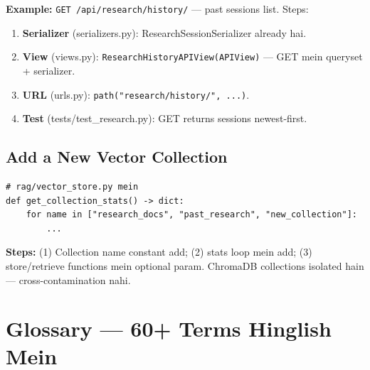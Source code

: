 \begin{codestorybox}
\textbf{Example:} \texttt{GET /api/research/history/} --- past sessions list. Steps:
\begin{enumerate}[label=\arabic*.]
\item \textbf{Serializer} (serializers.py): ResearchSessionSerializer already hai.
\item \textbf{View} (views.py): \texttt{ResearchHistoryAPIView(APIView)} --- GET mein queryset + serializer.
\item \textbf{URL} (urls.py): \texttt{path("research/history/", ...)}.
\item \textbf{Test} (tests/test\_research.py): GET returns sessions newest-first.
\end{enumerate}
\end{codestorybox}

\subsection{Add a New Vector Collection}

\begin{codestorybox}
\begin{lstlisting}[style=pythonstyle, caption={Naya collection example}]
# rag/vector_store.py mein
def get_collection_stats() -> dict:
    for name in ["research_docs", "past_research", "new_collection"]:
        ...
\end{lstlisting}

\textbf{Steps:} (1) Collection name constant add; (2) stats loop mein add; (3) store/retrieve functions mein optional param. ChromaDB collections isolated hain --- cross-contamination nahi.
\end{codestorybox}

\section{Glossary --- 60+ Terms Hinglish Mein}

